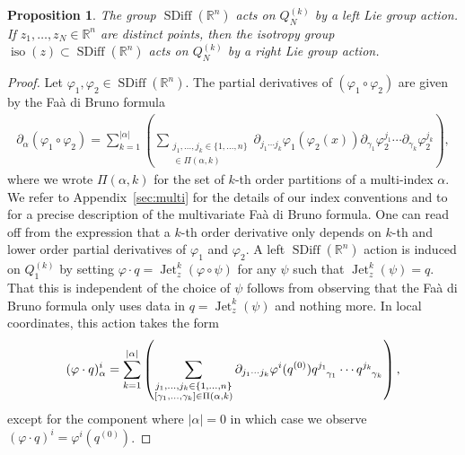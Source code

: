 \documentclass[12pt]{amsart}
\newcommand{\R}{\ensuremath{\mathbb{R}}}
\newtheorem{prop}[thm]{Proposition}
\DeclareMathOperator{\SDiff}{SDiff}
\DeclareMathOperator{\Jet}{Jet}
\DeclareMathOperator{\iso}{iso}
\begin{document}
  \begin{prop}
    The group $\SDiff(\R^n)$ acts on $Q_N^{(k)}$ by a left Lie group
    action.  If $z_1,\dots,z_N \in \R^n$ are distinct points,
    then the isotropy group $\iso(z) \subset \SDiff(\R^n)$
    acts on $Q_N^{(k)}$ by a right Lie group action. \label{HL_action_prop}
  \end{prop}
  \begin{proof}
    Let $\varphi_1,\varphi_2 \in \SDiff(\R^n)$.
    The partial derivatives of $(\varphi_1 \circ \varphi_2)$
    are given by the Fa\`a di Bruno formula
    \begin{align*}
      \partial_\alpha( \varphi_1 \circ \varphi_2) = \sum_{k=1}^{|\alpha|}
      \left(
        \sum_{
        \substack{
          j_1,\dots,j_k \in \{1,\dots,n\} \\
          [\gamma_1,\dots,\gamma_k] \in \Pi(\alpha , k)
          }
          }
          \partial_{j_1 \cdots j_k} \varphi_1(\varphi_2(x))
          \partial_{\gamma_1} \varphi_2^{j_1} \cdots
          \partial_{\gamma_k} \varphi_2^{j_k}
        \right),
    \end{align*}
where we wrote $\Pi(\alpha, k)$ for the set of $k$-th order partitions of a multi-index $\alpha$. We refer to Appendix~\ref{sec:multi} for the details of our index conventions and to \cite{ConstantineSavits1996,Jacobs2014b} for a
    precise description of the multivariate Fa\`a di Bruno formula.
    One can read off   from the expression that
    a $k$-th order derivative only depends on $k$-th 
    and lower order
    partial derivatives of $\varphi_1$ and $\varphi_2$.
        A left $\SDiff(\R^n)$ action is induced on $Q_1^{(k)}$ by
    setting $\varphi \cdot q = \Jet^k_z( \varphi \circ \psi)$
    for any $\psi$ such that $\Jet^k_z(\psi) = q$.
    That this is independent of the choice of $\psi$ follows
    from observing that the Fa\`a di Bruno formula
    only uses data in $q = \Jet^k_z(\psi)$ and nothing more.
    In local coordinates, this action takes the form
    \begin{align*}
    (\varphi \cdot q)^i_\alpha =
     \sum_{k=1}^{|\alpha|}
      \left(
        \sum_{
        \substack{
          j_1,\dots,j_k \in \{1,\dots,n\} \\
          [\gamma_1,\dots,\gamma_k] \in \Pi(\alpha , k)
          }
          }
          \partial_{j_1 \cdots j_k} \varphi^i(q^{(0)})
          q\indices{^{j_1}_{\gamma_1}} \cdots
          q\indices{^{j_k}_{\gamma_k}}
        \right),
    \end{align*}
    except for the component where $|\alpha | = 0$ in which case we observe $(\varphi \cdot q)^i = \varphi^i(q^{(0)})$.

\end{proof}
\end{document}
